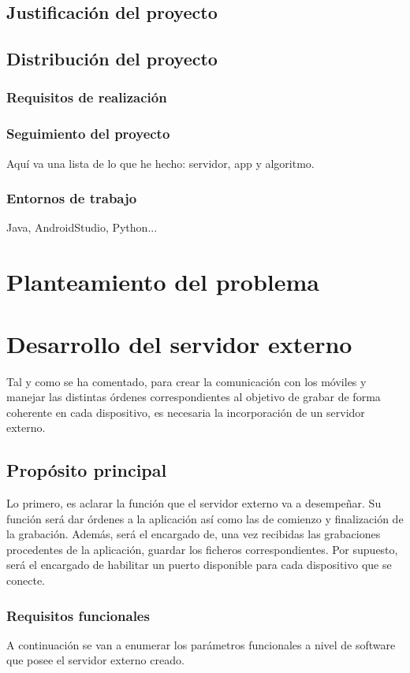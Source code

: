 \documentclass[a4paper,11pt]{book}
\begin{document}
	
	\section{Justificación del proyecto}
	\section{Distribución del proyecto}
		\subsection{Requisitos de realización}
		\subsection{Seguimiento del proyecto}
		Aquí va una lista de lo que he hecho: servidor, app y algoritmo.
		\subsection{Entornos de trabajo}
		Java, AndroidStudio, Python...
\chapter{Planteamiento del problema}

\chapter{Desarrollo del servidor externo}
	Tal y como se ha comentado, para crear la comunicación con los móviles y manejar las distintas órdenes correspondientes al objetivo de grabar de forma coherente en cada dispositivo, es necesaria la incorporación de un servidor externo.
	
	
		\section{Propósito principal}
			Lo primero, es aclarar la función que el servidor externo va a desempeñar. Su función será dar órdenes a la aplicación así como las de comienzo y finalización de la grabación. Además, será el encargado de, una vez recibidas las grabaciones procedentes de la aplicación, guardar los ficheros correspondientes. Por supuesto, será el encargado de habilitar un puerto disponible para cada dispositivo que se conecte.
			
			
			\subsection{Requisitos funcionales}
				A continuación se van a enumerar los parámetros funcionales a nivel de software que posee el servidor externo creado.
				
\end{document}
